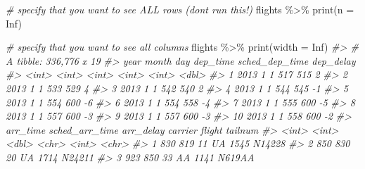 \documentclass[
]{book}
\newenvironment{Shaded}{\begin{snugshade}}{\end{snugshade}}
\newcommand{\AttributeTok}[1]{\textcolor[rgb]{0.77,0.63,0.00}{#1}}
\newcommand{\CommentTok}[1]{\textcolor[rgb]{0.56,0.35,0.01}{\textit{#1}}}
\newcommand{\ConstantTok}[1]{\textcolor[rgb]{0.00,0.00,0.00}{#1}}
\newcommand{\FunctionTok}[1]{\textcolor[rgb]{0.00,0.00,0.00}{#1}}
\newcommand{\NormalTok}[1]{#1}
\newcommand{\SpecialCharTok}[1]{\textcolor[rgb]{0.00,0.00,0.00}{#1}}
\begin{document}
\begin{Shaded}
\begin{Highlighting}[]
\CommentTok{\# specify that you want to see ALL rows (don\textquotesingle{}t run this!)}
\NormalTok{flights }\SpecialCharTok{\%\textgreater{}\%} \FunctionTok{print}\NormalTok{(}\AttributeTok{n =} \ConstantTok{Inf}\NormalTok{)}
\end{Highlighting}
\end{Shaded}

\begin{Shaded}
\begin{Highlighting}[]
\CommentTok{\# specify that you want to see all columns}
\NormalTok{flights }\SpecialCharTok{\%\textgreater{}\%} \FunctionTok{print}\NormalTok{(}\AttributeTok{width =} \ConstantTok{Inf}\NormalTok{)}
\CommentTok{\#\textgreater{} \# A tibble: 336,776 x 19}
\CommentTok{\#\textgreater{}     year month   day dep\_time sched\_dep\_time dep\_delay}
\CommentTok{\#\textgreater{}    \textless{}int\textgreater{} \textless{}int\textgreater{} \textless{}int\textgreater{}    \textless{}int\textgreater{}          \textless{}int\textgreater{}     \textless{}dbl\textgreater{}}
\CommentTok{\#\textgreater{}  1  2013     1     1      517            515         2}
\CommentTok{\#\textgreater{}  2  2013     1     1      533            529         4}
\CommentTok{\#\textgreater{}  3  2013     1     1      542            540         2}
\CommentTok{\#\textgreater{}  4  2013     1     1      544            545        {-}1}
\CommentTok{\#\textgreater{}  5  2013     1     1      554            600        {-}6}
\CommentTok{\#\textgreater{}  6  2013     1     1      554            558        {-}4}
\CommentTok{\#\textgreater{}  7  2013     1     1      555            600        {-}5}
\CommentTok{\#\textgreater{}  8  2013     1     1      557            600        {-}3}
\CommentTok{\#\textgreater{}  9  2013     1     1      557            600        {-}3}
\CommentTok{\#\textgreater{} 10  2013     1     1      558            600        {-}2}
\CommentTok{\#\textgreater{}    arr\_time sched\_arr\_time arr\_delay carrier flight tailnum}
\CommentTok{\#\textgreater{}       \textless{}int\textgreater{}          \textless{}int\textgreater{}     \textless{}dbl\textgreater{} \textless{}chr\textgreater{}    \textless{}int\textgreater{} \textless{}chr\textgreater{}  }
\CommentTok{\#\textgreater{}  1      830            819        11 UA        1545 N14228 }
\CommentTok{\#\textgreater{}  2      850            830        20 UA        1714 N24211 }
\CommentTok{\#\textgreater{}  3      923            850        33 AA        1141 N619AA }

\end{Highlighting}
\end{Shaded}
\end{document}
